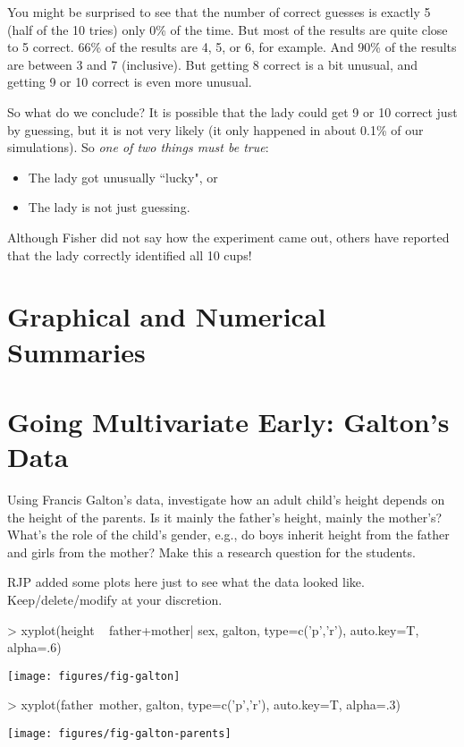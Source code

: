 You might be surprised to see that the number of correct guesses
is exactly 5 (half of the 10 tries) only 
0\%
of the time.  But most of the results are quite close to 5 correct.
66\% of the results are 
4, 5, or 6, for example.
And 90\% of the results 
are  between 3 and 7 (inclusive).
But getting 8 correct is a bit unusual, and getting 9 or 10 correct is even 
more unusual.  

So what do we conclude?  It is possible that the lady could get 9 or 10 correct
just by guessing, but it is not very likely (it only happened in about
0.1\% of our simulations). 
So \emph{one of two things must be true}:
\begin{itemize}
\item The lady got unusually ``lucky", or 
\item The lady is not just guessing.
\end{itemize}

Although Fisher did not say how the experiment came out, others have reported
that the lady correctly identified all 10 cups!
\cite{salsburg}




\section{Graphical and Numerical Summaries}

\section{Going Multivariate Early: Galton's Data}

Using Francis Galton's data, investigate how an adult child's height depends on the height of the parents.  Is
it mainly the father's height, mainly the mother's?  What's the role
of the child's gender, e.g., do boys inherit height from the father
and girls from the mother?  Make this a research question for the students.  

RJP added some plots here just to see what the data looked like.  
Keep/delete/modify at your discretion.

\begin{center}
\begin{Schunk}
\begin{Sinput}
> xyplot(height ~ father+mother| sex, galton, type=c('p','r'), auto.key=T, alpha=.6)
\end{Sinput}
\end{Schunk}
\texttt{[image: figures/fig-galton]}
\begin{Schunk}
\begin{Sinput}
> xyplot(father~mother, galton, type=c('p','r'), auto.key=T, alpha=.3)
\end{Sinput}
\end{Schunk}
\texttt{[image: figures/fig-galton-parents]}
\end{center}
